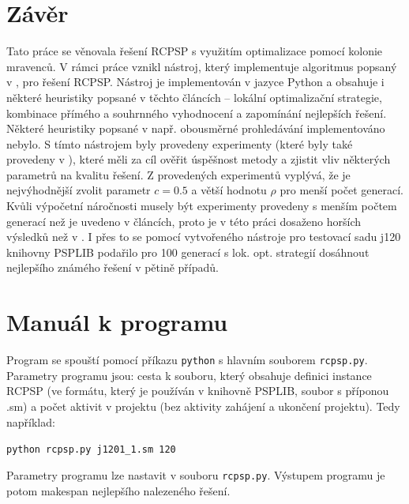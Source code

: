 \documentclass[a4paper,12pt]{article}
\begin{document}
\section{Závěr}
Tato práce se věnovala řešení RCPSP s využitím optimalizace pomocí kolonie mravenců. V rámci práce vznikl nástroj, který 
implementuje algoritmus popsaný v \cite{Merkle00antcolony, 1027745}, pro řešení RCPSP. Nástroj je implementován v jazyce 
Python a obsahuje i některé heuristiky
popsané v těchto článcích -- lokální optimalizační strategie, kombinace přímého a souhrnného vyhodnocení a zapomínání 
nejlepších řešení. Některé heuristiky popsané v \cite{1027745} např. obousměrné prohledávání implementováno nebylo. S tímto
nástrojem byly provedeny experimenty (které byly také provedeny v \cite{Merkle00antcolony, 1027745}), které měli za cíl 
ověřit úspěšnost metody a zjistit vliv některých parametrů na kvalitu řešení. Z provedených experimentů vyplývá, že je 
nejvýhodnější zvolit parametr $c = 0.5$ a větší hodnotu $\rho$ pro menší počet generací. Kvůli výpočetní náročnosti musely být
experimenty provedeny s menším počtem generací než je uvedeno v článcích, proto je v této práci dosaženo horších
výsledků než v \cite{Merkle00antcolony, 1027745}.  I přes to se pomocí vytvořeného nástroje pro testovací sadu j120 
knihovny PSPLIB podařilo pro 100 generací s lok. opt. strategií dosáhnout nejlepšího známého řešení v pětině případů.

\newpage
\appendix
\section{Manuál k programu}
Program se spouští pomocí příkazu \texttt{python} s hlavním souborem \texttt{rcpsp.py}. Parametry
programu jsou: cesta k souboru, který obsahuje definici instance RCPSP (ve formátu, který je používán
v knihovně PSPLIB, soubor s příponou .sm) a počet aktivit v projektu (bez aktivity zahájení a ukončení projektu). 
Tedy například: 
\begin{center}
\texttt{python rcpsp.py j1201\_1.sm 120}
\end{center}
Parametry programu lze nastavit v souboru \texttt{rcpsp.py}. Výstupem programu je potom makespan nejlepšího nalezeného řešení. 


{}
\end{document}
